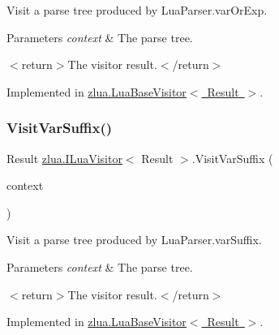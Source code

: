 Visit a parse tree produced by Lua\+Parser.\+var\+Or\+Exp. 


\begin{DoxyParams}{Parameters}
{\em context} & The parse tree.\\
\hline
\end{DoxyParams}
$<$return$>$The visitor result.$<$/return$>$ 

Implemented in \mbox{\hyperlink{classzlua_1_1_lua_base_visitor_af08ef8c1371425dfa9b10a7df2e8e011}{zlua.\+Lua\+Base\+Visitor$<$ Result $>$}}.

\mbox{\label{interfacezlua_1_1_i_lua_visitor_ae2449e1f9969f993c00cea039da1d48e}} 
\subsubsection{\texorpdfstring{Visit\+Var\+Suffix()}{VisitVarSuffix()}}
{\footnotesize\ttfamily Result \mbox{\hyperlink{interfacezlua_1_1_i_lua_visitor}{zlua.\+I\+Lua\+Visitor}}$<$ Result $>$.Visit\+Var\+Suffix (\begin{DoxyParamCaption}\item[{\mbox{[}\+Not\+Null\mbox{]} \mbox{\hyperlink{classzlua_1_1_lua_parser_1_1_var_suffix_context}{Lua\+Parser.\+Var\+Suffix\+Context}}}]{context }\end{DoxyParamCaption})}



Visit a parse tree produced by Lua\+Parser.\+var\+Suffix. 


\begin{DoxyParams}{Parameters}
{\em context} & The parse tree.\\
\hline
\end{DoxyParams}
$<$return$>$The visitor result.$<$/return$>$ 

Implemented in \mbox{\hyperlink{classzlua_1_1_lua_base_visitor_a43417c615a3946d541cbecfec5d5a861}{zlua.\+Lua\+Base\+Visitor$<$ Result $>$}}.

\mbox{\label{interfacezlua_1_1_i_lua_visitor_a89838dbcf062f4b3adaf75df89febc8d}} 
